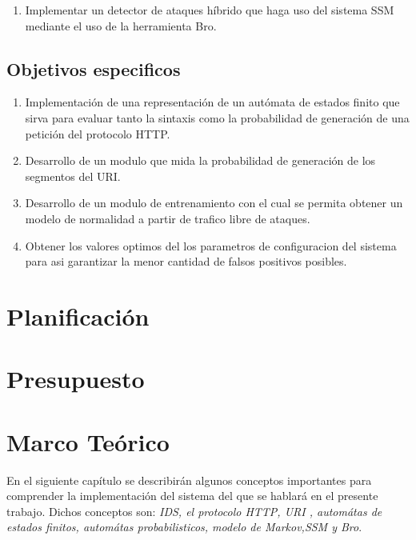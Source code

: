 \documentclass{article}
\begin{document}
\begin{enumerate}
  \item Implementar un detector de ataques híbrido que haga uso del sistema SSM mediante el uso de la herramienta Bro.
\end{enumerate}


\subsection{Objetivos especificos}


\begin{enumerate}
  \item Implementación de una representación de un autómata de estados finito que sirva para evaluar tanto la sintaxis como la probabilidad de generación de una petición del protocolo HTTP.\\
  \item Desarrollo de un modulo que mida la probabilidad de generación de los segmentos del URI.\\
  \item Desarrollo de un modulo de entrenamiento con el cual se permita obtener un modelo de normalidad a partir de trafico libre de ataques.\\
  \item Obtener los valores optimos del los parametros de configuracion del sistema para asi garantizar la menor cantidad de falsos positivos posibles.\\
\end{enumerate}

\section{Planificaci\'on}
\section{Presupuesto}



\section{Marco Te\'orico}

En el siguiente cap\'itulo se describir\'an algunos conceptos importantes para comprender la implementaci\'on del sistema del que se hablar\'a en el presente trabajo. Dichos conceptos son: \textit{IDS, el protocolo HTTP, URI , autom\'atas de estados finitos, autom\'atas probabilisticos, modelo de Markov,SSM y Bro}.\\
\end{document}
